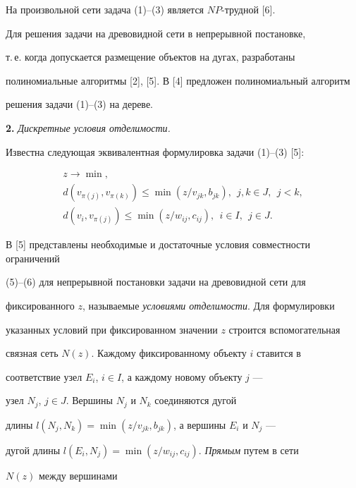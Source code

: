 На произвольной сети задача (1)--(3) является $NP$-трудной [6].


Для решения задачи на древовидной сети в непрерывной постановке,


т.\,е. когда допускается размещение объектов на дугах, разработаны


полиномиальные алгоритмы [2], [5]. В [4] предложен полиномиальный алгоритм


решения задачи (1)--(3) на дереве.


\medskip





{\bf 2.} {\it Дискретные условия отделимости.}


Известна следующая эквивалентная формулировка задачи (1)--(3) [5]:


\begin{gather}


z \rightarrow \min, \\


d(v_{\pi(j)},v_{\pi(k)}) \leq \min(z/v_{jk},b_{jk}), \ \ j,k \in J, \ \ j < k, \\


d(v_{i},v_{\pi(j)}) \leq \min(z/w_{ij},c_{ij}), \ \ i \in I, \ \ j \in J.


\end{gather}





В [5] представлены необходимые и достаточные условия совместности ограничений


(5)--(6) для непрерывной постановки задачи на древовидной сети для


фиксированного $z$, называемые {\it условиями отделимости}. Для формулировки


указанных условий при фиксированном значении $z$ строится вспомогательная


связная сеть $N(z)$. Каждому фиксированному объекту $i$ ставится в


соответствие узел $E_{i}$, $i \in I$, а каждому новому объекту $j$ ---


узел $N_{j}$, $j \in J$. Вершины $N_{j}$ и $N_{k}$ соединяются дугой


длины $l(N_{j},N_{k})=\min(z/v_{jk},b_{jk})$, а вершины $E_{i}$ и $N_{j}$ ---


дугой длины $l(E_{i},N_{j})=\min(z/w_{ij},c_{ij})$. {\it Прямым} путем в сети


$N(z)$ между вершинами


